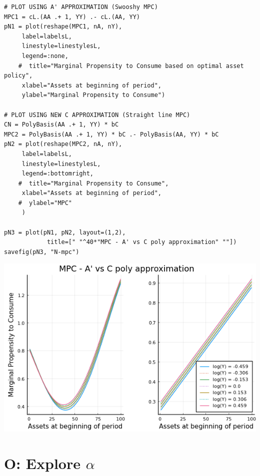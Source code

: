 \documentclass[12pt]{article}
\begin{document}
\begin{lstlisting}[language=JuliaLocal, style=julia]
# PLOT USING A' APPROXIMATION (Swooshy MPC)
MPC1 = cL.(AA .+ 1, YY) .- cL.(AA, YY)
pN1 = plot(reshape(MPC1, nA, nY),
     label=labelsL,
     linestyle=linestylesL,
     legend=:none,
    #  title="Marginal Propensity to Consume based on optimal asset policy",
     xlabel="Assets at beginning of period",
     ylabel="Marginal Propensity to Consume")

# PLOT USING NEW C APPROXIMATION (Straight line MPC)
CN = PolyBasis(AA .+ 1, YY) * bC
MPC2 = PolyBasis(AA .+ 1, YY) * bC .- PolyBasis(AA, YY) * bC
pN2 = plot(reshape(MPC2, nA, nY),
     label=labelsL,
     linestyle=linestylesL,
     legend=:bottomright,
    #  title="Marginal Propensity to Consume",
     xlabel="Assets at beginning of period",
    #  ylabel="MPC"
     )

pN3 = plot(pN1, pN2, layout=(1,2),
            title=[" "^40*"MPC - A' vs C poly approximation" ""])
savefig(pN3, "N-mpc")
\end{lstlisting}

\includegraphics[]{problem sets/ps8/N-mpc.png}






\newpage
\section*{O: Explore $\alpha$}
\end{document}
